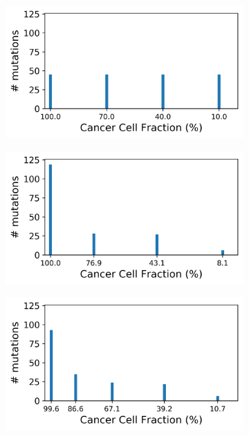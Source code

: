 \documentclass{article}
\begin{document}
\begin{figure}[h]
	\centering
	\begin{subfigure}[t]{0.32\linewidth}
		\centering
		\includegraphics[width = 1.0\linewidth, trim={0 0 0 0}, clip=true]{pyclone_analysis_0_7CN/realcols.png}
	\end{subfigure}%
	\hspace{0.01 \linewidth}
	\begin{subfigure}[t]{0.32\linewidth}
		\centering
		\includegraphics[width = 1.0\linewidth, trim={0 0 0 0}, clip=true]{ccube_analysis_noCN/cols.png}
	\end{subfigure}%
	\hspace{0.01 \linewidth}
	\begin{subfigure}[t]{0.32\linewidth}
		\centering
		\includegraphics[width = 1.0\linewidth, trim={0 0 0 0}, clip=true]{ccube_analysis_0_7CN/cols.png}

\end{subfigure}
\end{figure}
\end{document}
